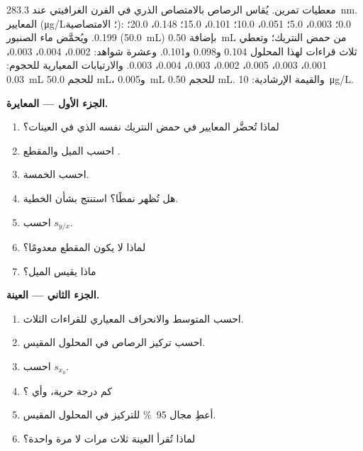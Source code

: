 \begin{problem}
\label{pb:b2:measurement-statistics:1}
معطيات تمرين. يُقاس الرصاص بالامتصاص الذري في الفرن الغرافيتي عند \qty{283.3}{nm}. المعايير
(\unit{\micro g/L}؛ الامتصاصية): 0.0؛ 0.003، 5.0؛ 0.051، 10.0؛ 0.101، 15.0؛ 0.148، 20.0؛ 0.199. ويُحمَّض
ماء الصنبور (\qty{50.0}{mL}) بإضافة \qty{0.50}{mL} من حمض النتريك؛ وتعطي ثلاث قراءات لهذا
المحلول 0.104 و0.098 و0.101. وعشرة شواهد: 0.002، 0.004، 0.003، 0.001، 0.003، 0.005، 0.002،
0.003، 0.004، 0.003. والارتيابات المعيارية للحجوم: \qty{0.03}{mL} للحجم 50.0 mL،
و\qty{0.005}{mL} للحجم 0.50 mL. والقيمة الإرشادية: \qty{10}{\micro g/L}.

\medskip
\noindent\textbf{الجزء الأول --- المعايرة.}
\begin{enumerate}
  \item لماذا تُحضَّر المعايير في حمض النتريك نفسه الذي في العينات؟
  \item احسب الميل والمقطع .
  \item احسب  الخمسة.
  \item هل تُظهر  نمطًا؟ استنتج بشأن الخطية.
  \item احسب $s_{y/x}$.
  \item لماذا لا يكون المقطع معدومًا؟
  \item ماذا يقيس الميل؟
\end{enumerate}

\medskip
\noindent\textbf{الجزء الثاني --- العينة.}
\begin{enumerate}[resume]
  \item احسب المتوسط والانحراف المعياري للقراءات الثلاث.
  \item احسب تركيز الرصاص في المحلول المقيس.
  \item احسب $s_{x_0}$.
  \item كم درجة حرية، وأي ؟
  \item أعطِ مجال 95~\% للتركيز في المحلول المقيس.
  \item لماذا تُقرأ العينة ثلاث مرات لا مرة واحدة؟
\end{enumerate}


\end{problem}
